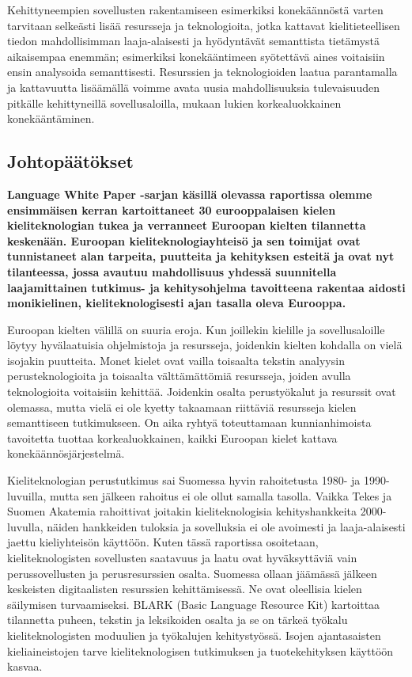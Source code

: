 \documentclass[]{../../metanetpaper}
\begin{document}
\begin{multicols}{2}
Kehittyneempien sovellusten rakentamiseen esimerkiksi konekäännöstä
varten tarvitaan selkeästi lisää resursseja ja teknologioita, jotka
kattavat kielitieteellisen tiedon mahdollisimman laaja-alaisesti ja
hyödyntävät semanttista tietämystä aikaisempaa enemmän; esimerkiksi
konekääntimeen syötettävä aines voitaisiin ensin analysoida
semanttisesti. Resurssien ja teknologioiden laatua parantamalla ja
kattavuutta lisäämällä voimme avata uusia mahdollisuuksia
tulevaisuuden pitkälle kehittyneillä sovellusaloilla, mukaan lukien
korkealuokkainen konekääntäminen.


\subsection{Johtopäätökset}


\textbf{Language White Paper -sarjan käsillä olevassa raportissa
olemme ensimmäisen kerran kartoittaneet 30 eurooppalaisen kielen
kieliteknologian tukea ja verranneet Euroopan kielten tilannetta
keskenään. Euroopan kieliteknologiayhteisö ja sen toimijat ovat
tunnistaneet alan tarpeita, puutteita ja kehityksen esteitä ja ovat
nyt tilanteessa, jossa avautuu mahdollisuus yhdessä suunnitella
laajamittainen tutkimus- ja kehitysohjelma tavoitteena rakentaa
aidosti monikielinen, kieliteknologisesti ajan tasalla oleva
Eurooppa.}

Euroopan kielten välillä on suuria eroja. Kun joillekin kielille ja
sovellusaloille löytyy hyvälaatuisia ohjelmistoja ja resursseja,
joidenkin kielten kohdalla on vielä isojakin puutteita. Monet kielet
ovat vailla toisaalta tekstin analyysin perusteknologioita ja
toisaalta välttämättömiä resursseja, joiden avulla teknologioita
voitaisiin kehittää. Joidenkin osalta perustyökalut ja resurssit ovat
olemassa, mutta vielä ei ole kyetty takaamaan riittäviä resursseja
kielen semanttiseen tutkimukseen. On aika ryhtyä toteuttamaan
kunnianhimoista tavoitetta tuottaa korkealuokkainen, kaikki Euroopan
kielet kattava konekäännösjärjestelmä.

Kieliteknologian perustutkimus sai Suomessa hyvin rahoitetusta 1980-
ja 1990-luvuilla, mutta sen jälkeen rahoitus ei ole ollut samalla
tasolla. Vaikka Tekes ja Suomen Akatemia rahoittivat joitakin
kieliteknologisia kehityshankkeita 2000-luvulla, näiden hankkeiden
tuloksia ja sovelluksia ei ole avoimesti ja laaja-alaisesti jaettu
kieliyhteisön käyttöön. Kuten tässä raportissa osoitetaan,
kieliteknologisten sovellusten saatavuus ja laatu ovat hyväksyttäviä
vain perussovellusten ja perusresurssien osalta. Suomessa ollaan
jäämässä jälkeen keskeisten digitaalisten resurssien
kehittämisessä. Ne ovat oleellisia kielen säilymisen
turvaamiseksi. BLARK (Basic Language Resource Kit) kartoittaa
tilannetta puheen, tekstin ja leksikoiden osalta ja se on tärkeä
työkalu kieliteknologisten moduulien ja työkalujen
kehitystyössä. Isojen ajantasaisten kieliaineistojen tarve
kieliteknologisen tutkimuksen ja tuotekehityksen käyttöön kasvaa.


\end{multicols}
\end{document}
